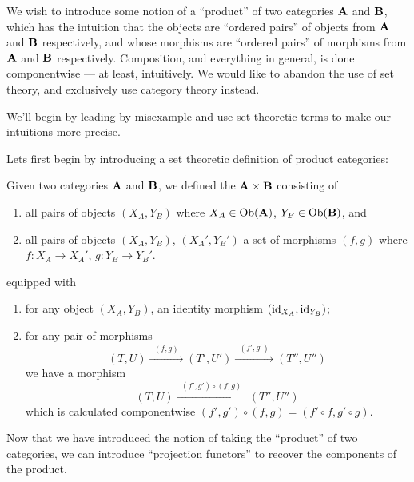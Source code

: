 
\begin{prob}
We wish to introduce some notion of a ``product'' of two
categories $\mathbf{A}$ and $\mathbf{B}$, which has the intuition that
the objects are ``ordered pairs'' of objects from $\mathbf{A}$ and
$\mathbf{B}$ respectively, and whose morphisms are ``ordered pairs''
of morphisms from $\mathbf{A}$ and $\mathbf{B}$
respectively. Composition, and everything in general, is done
componentwise --- at least, intuitively. We would like to abandon
the use of set theory, and exclusively use category theory instead.
\end{prob}

We'll begin by leading by misexample and use set theoretic terms
to make our intuitions more precise.

Lets first begin by introducing a set theoretic definition of
product categories:
\begin{defn}%
Given two categories $\mathbf{A}$ and $\mathbf{B}$, we defined the
 $\mathbf{A}\times\mathbf{B}$ consisting of
\begin{enumerate}
\item all pairs of objects $(X_{A},Y_{B})$ where
  $X_{A}\in\operatorname{Ob}(\mathbf{A})$, $Y_{B}\in\operatorname{Ob}(\mathbf{B})$, and
\item all pairs of objects $(X_{A},Y_{B})$, $(X_{A}',Y_{B}')$ a
  set of morphisms $(f,g)$ where $f:X_{A}\to X_{A}'$, $g:Y_{B}\to Y_{B}'$.
\end{enumerate}
equipped with
\begin{enumerate}
\item for any object $(X_{A},Y_{B})$, an identity morphism
  $(\operatorname{id}_{X_{A}},\operatorname{id}_{Y_{B}})$;
\item for any pair of morphisms 
$$(T,U)\xrightarrow{\;\;(f,g)\;\;}(T',U')\xrightarrow{\;\;(f',g')\;\;}(T'',U'')$$
we have a morphism
$$(T,U)\xrightarrow{\;\;(f',g')\circ(f,g)\;\;}(T'',U'')$$
which is calculated componentwise $(f',g')\circ(f,g)=(f'\circ
f,g'\circ g)$.
\end{enumerate}
\end{defn}

Now that we have introduced the notion of taking the ``product''
of two categories, we can introduce ``projection functors'' to
recover the components of the product.

